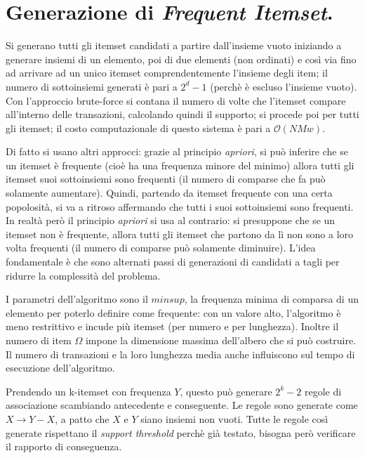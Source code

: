 \documentclass[11pt, a4page, twocolumn]{article}
\begin{document}
\section{Generazione di \textit{Frequent Itemset}.}
Si generano tutti gli itemset candidati a partire dall'insieme vuoto iniziando a generare insiemi di un elemento, poi di due elementi (non ordinati) e così via fino ad arrivare ad un unico itemset comprendentemente l'insieme degli item; il numero di sottoinsiemi generati è pari a $2^d - 1$ (perchè è escluso l'insieme vuoto).
Con l'approccio brute-force si contana il numero di volte che l'itemset compare all'interno delle transazioni, calcolando quindi il supporto; si procede poi per tutti gli itemset; il costo computazionale di questo sistema è pari a $\mathcal{O}(NMw)$. \newline

Di fatto si usano altri approcci: grazie al principio \textit{apriori}, si può inferire che se un itemset è frequente (cioè ha una frequenza minore del minimo) allora tutti gli itemset suoi sottoinsiemi sono frequenti (il numero di comparse che fa può solamente aumentare).
Quindi, partendo da itemset frequente con una certa popolosità, si va a ritroso affermando che tutti i suoi sottoinsiemi sono frequenti.
In realtà però il principio \textit{apriori} si usa al contrario: si presuppone che se un itemset non è frequente, allora tutti gli itemset che partono da lì non sono a loro volta frequenti (il numero di comparse può solamente diminuire).
L'idea fondamentale è che sono alternati passi di generazioni di candidati a tagli per ridurre la complessità del problema.

I parametri dell'algoritmo sono il $minsup$, la frequenza minima di comparsa di un elemento per poterlo definire come frequente: con un valore alto, l'algoritmo è meno restrittivo e incude più itemset (per numero e per lunghezza).
Inoltre il numero di item $\Omega$ impone la dimensione massima dell'albero che si può costruire.
Il numero di transazioni e la loro lunghezza media anche influiscono sul tempo di esecuzione dell'algoritmo.

Prendendo un k-itemset con frequenza $Y$, questo può generare $2^k - 2$ regole di associazione scambiando antecedente e conseguente.
Le regole sono generate come $X \rightarrow Y - X$, a patto che $X$ e $Y$ siano insiemi non vuoti.
Tutte le regole così generate rispettano il \textit{support threshold} perchè già testato, bisogna però verificare il rapporto di conseguenza.
\end{document}
